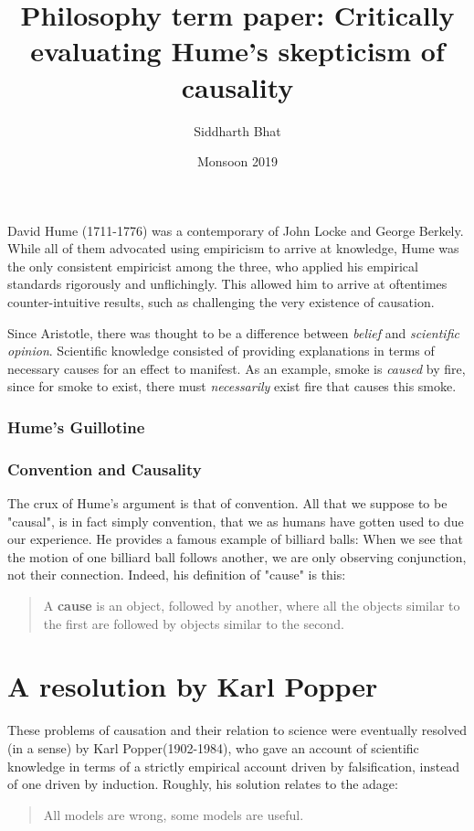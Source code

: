 \documentclass{article}
\title{Philosophy term paper: Critically
evaluating Hume's skepticism of causality}
\author{Siddharth Bhat}
\date{Monsoon 2019}
\begin{document}
 
\maketitle

David Hume (1711-1776) was a contemporary of John Locke and George Berkely.
While all of them advocated using empiricism to arrive at knowledge, Hume was
the only consistent empiricist among the three, who applied his empirical
standards rigorously and unflichingly. This allowed him to arrive at oftentimes
counter-intuitive results, such as challenging the very existence of causation.

Since Aristotle, there was thought to be a difference between \emph{belief}
and \emph{scientific opinion}. Scientific knowledge consisted of providing
explanations in terms of necessary causes for an effect to manifest. As an
example, smoke is \emph{caused} by fire, since for smoke to exist, there must
\emph{necessarily} exist fire that causes this smoke. 

\subsubsection{Hume's Guillotine}

\subsubsection{Convention and Causality}
The crux of Hume's argument is that of convention. All that we suppose to be
"causal", is in fact simply convention, that we as humans have gotten used to
due our experience. He provides a famous example of billiard balls: When we see
that the motion of one billiard ball follows another, we are only observing
conjunction, not their connection. Indeed, his definition of "cause" is this:
\begin{quote} A \textbf{cause} is an object, followed by another, where all the
objects similar to the first are followed by objects similar to the second.
\end{quote}




\section{A resolution by Karl Popper} 

These problems of causation and their
relation to science were eventually resolved (in a sense) by Karl
Popper(1902-1984), who gave an account of scientific knowledge in terms of a
strictly empirical account driven by falsification, instead of one driven by
induction. Roughly, his solution relates to the adage: \begin{quotation} All
models are wrong, some models are useful.  \end{quotation}
\end{document}
